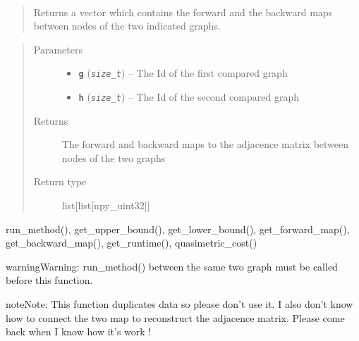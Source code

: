 \documentclass[letterpaper,10pt,english]{sphinxmanual}
\begin{document}

\begin{fulllineitems}
\label{doc:gedlibpy.get_all_map}~\begin{quote}

Returns a vector which contains the forward and the backward maps between nodes of the two indicated graphs.
\end{quote}
\begin{quote}\begin{description}
\item[{Parameters}] \leavevmode\begin{itemize}
\item {} 
\textbf{\texttt{g}} (\emph{\texttt{size\_t}}) -- The Id of the first compared graph

\item {} 
\textbf{\texttt{h}} (\emph{\texttt{size\_t}}) -- The Id of the second compared graph

\end{itemize}

\item[{Returns}] \leavevmode
The forward and backward maps to the adjacence matrix between nodes of the two graphs

\item[{Return type}] \leavevmode
list{[}list{[}npy\_uint32{]}{]}

\end{description}\end{quote}




run\_method(), get\_upper\_bound(), get\_lower\_bound(),  get\_forward\_map(), get\_backward\_map(), get\_runtime(), quasimetric\_cost()



\begin{notice}{warning}{Warning:}
run\_method() between the same two graph must be called before this function.
\end{notice}

\begin{notice}{note}{Note:}
This function duplicates data so please don't use it. I also don't know how to connect the two map to reconstruct the adjacence matrix. Please come back when I know how it's work !
\end{notice}

\end{fulllineitems}
\end{document}
